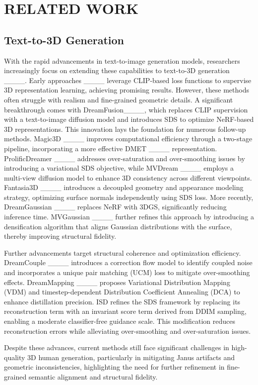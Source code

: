 \section{RELATED WORK}
\label{2}
\subsection{Text-to-3D Generation}\label{2.1}
With the rapid advancements in text-to-image generation models, researchers increasingly focus on extending these capabilities to text-to-3D generation ____. Early approaches ____ leverage CLIP-based loss functions to supervise 3D representation learning, achieving promising results. However, these methods often struggle with realism and fine-grained geometric details. A significant breakthrough comes with DreamFusion____, which replaces CLIP supervision with a text-to-image diffusion model and introduces SDS to optimize NeRF-based 3D representations. This innovation lays the foundation for numerous follow-up methods.
Magic3D ____ improves computational efficiency through a two-stage pipeline, incorporating a more effective DMET ____ representation. ProlificDreamer ____ addresses over-saturation and over-smoothing issues by introducing a variational SDS objective, while MVDream ____ employs a multi-view diffusion model to enhance 3D consistency across different viewpoints. Fantasia3D ____ introduces a decoupled geometry and appearance modeling strategy, optimizing surface normals independently using SDS loss. More recently, DreamGaussian ____ replaces NeRF with 3DGS, significantly reducing inference time. MVGaussian ____ further refines this approach by introducing a densification algorithm that aligns Gaussian distributions with the surface, thereby improving structural fidelity.

Further advancements target structural coherence and optimization efficiency. DreamCouple ____ introduces a correction flow model to identify coupled noise and incorporates a unique pair matching (UCM) loss to mitigate over-smoothing effects. DreamMapping ____ proposes Variational Distribution Mapping (VDM) and timestep-dependent Distribution Coefficient Annealing (DCA) to enhance distillation precision. ISD refines the SDS framework by replacing its reconstruction term with an invariant score term derived from DDIM sampling, enabling a moderate classifier-free guidance scale. This modification reduces reconstruction errors while alleviating over-smoothing and over-saturation issues.

Despite these advances, current methods still face significant challenges in high-quality 3D human generation, particularly in mitigating Janus artifacts and geometric inconsistencies, highlighting the need for further refinement in fine-grained semantic alignment and structural fidelity.
